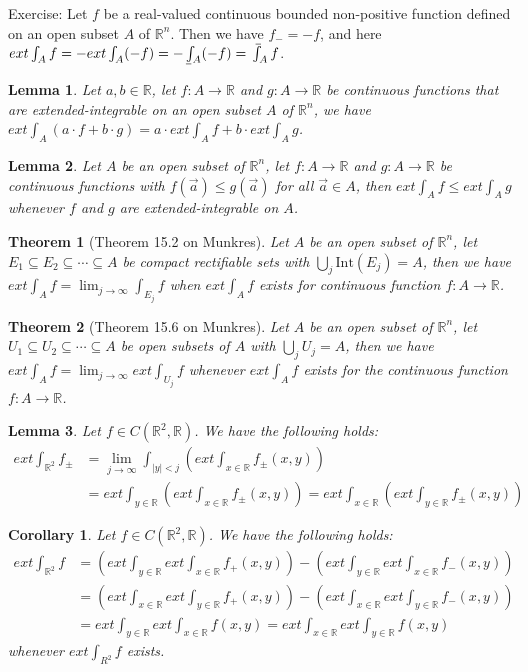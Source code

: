 \documentclass[11pt,oneside]{book}
\theoremstyle{break}
\theoremstyle{break}
\newtheorem{thm}{Theorem}[section]
\newtheorem{lem}{Lemma}[thm]
\newtheorem{corL}{Corollary}[lem]
\def\upint{\mathchoice%
    {\mkern13mu\overline{\vphantom{\intop}\mkern7mu}\mkern-20mu}%
    {\mkern7mu\overline{\vphantom{\intop}\mkern7mu}\mkern-14mu}%
    {\mkern7mu\overline{\vphantom{\intop}\mkern7mu}\mkern-14mu}%
    {\mkern7mu\overline{\vphantom{\intop}\mkern7mu}\mkern-14mu}%
  \int}
\def\lowint{\mkern3mu\underline{\vphantom{\intop}\mkern7mu}\mkern-10mu\int}
\newcommand{\R}{\mathbb{R}}
\newcommand{\Int}{\text{Int}}
\newcommand{\exercise}{\color{green}Exercise: \color{black}}
\begin{document}
\exercise Let $f$ be a real-valued continuous bounded non-positive function defined on an open subset $A $ of $\R^n$. Then we have $f_- = -f$, and here $ext \int_A f = -ext\int_A (-f) = -\lowint_A (-f) = \upint_A f$. \\

\begin{lem}
Let $a,b\in \R$, let $f:A \to \R$ and $g:A \to \R$ be continuous functions that are extended-integrable on an open subset $A$ of $\R^n$, we have $ext \int_A (a\cdot f+b\cdot g) = a\cdot ext\int_A f + b \cdot ext\int_A g$.
\end{lem}

\begin{lem}
Let $A$ be an open subset of $\R^n$, let $f:A \to \R$ and $g:A \to \R$ be continuous functions with $f(\vec{a})\leq g(\vec{a})$ for all $\vec{a}\in A$, then $ext \int_A f \leq ext \int_A g$ whenever $f$ and $g$ are extended-integrable on $A$. 
\end{lem}

\begin{thm}[Theorem 15.2 on Munkres]
Let $A$ be an open subset of $\R^n$, let $E_1 \subseteq E_2\subseteq \cdots \subseteq A$ be compact rectifiable sets with $\bigcup_j \Int(E_j) = A$, then we have $ext\int_A f = \lim_{j\to \infty} \int_{E_j} f$ when $ext\int_A f $ exists for continuous function $f:A \to \R$.
\end{thm}

\begin{thm}[Theorem 15.6 on Munkres] 
Let $A$ be an open subset of $\R^n$, let $U_1 \subseteq U_2 \subseteq \cdots \subseteq A$ be open subsets of $A$ with $\bigcup_j U_j = A$, then we have $ext \int_A f = \lim_{j \to \infty} ext \int_{U_j} f$ whenever $ext\int_A f $ exists for the continuous function $f:A \to \R$. 
\end{thm}

\begin{lem}
Let $f \in C\left(\R^2,\R\right)$. We have the following holds:
\begin{align*}
ext \int_{\R^2} f_\pm &= \lim_{j\to \infty} \int_{|y|<j} \left(ext\int_{x \in \R} f_\pm\left(x,y\right)\right) \\&= ext\int_{y\in \R} \left(ext\int_{x \in \R} f_\pm\left(x,y\right)\right) = ext \int_{x \in \R} \left(ext\int_{y \in \R} f_\pm\left(x,y\right)\right)
\end{align*}
\end{lem}

\begin{corL}
Let $f \in C\left(\R^2,\R\right)$. We have the following holds:
\begin{align*}
ext\int_{\R^2} f &= \left(ext \int_{y \in \R} ext\int_{x \in \R}f_+(x,y) \right)- \left(ext\int_{y \in \R} ext\int_{x \in \R} f_-(x,y)\right) \\&= \left(ext\int_{x \in \R} ext \int_{y \in \R} f_+ (x,y)\right) - \left(ext \int_{x \in \R} ext \int_{y \in \R} f_-(x,y)\right) \\&= ext \int_{y \in \R} ext\int_{x \in \R} f(x,y) = ext \int_{x \in \R} ext\int_{y \in \R} f(x,y)
\end{align*}
whenever $ext\int_{R^2} f $ exists. 
\end{corL}
\end{document}
